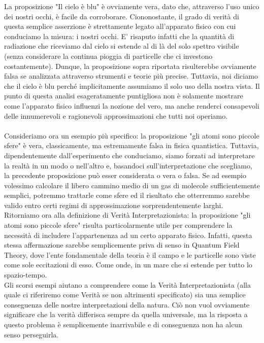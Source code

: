 \documentclass[]{article}
\begin{document}
	La proposizione "Il cielo è blu" è ovviamente vera, dato che, attraverso l'uso unico dei nostri occhi, è facile da corroborare. Ciononostante, il grado di verità di questa semplice asserzione è strettamente legato all'apparato fisico con cui conduciamo la misura: i nostri occhi. E' risaputo infatti che la quantità di radiazione che riceviamo dal cielo si estende al di là del solo spettro visibile (senza considerare la continua pioggia di particelle che ci investono costantemente). Dunque, la proposizione sopra riportata risulterebbe ovviamente falsa se analizzata attraverso strumenti e teorie più precise. Tuttavia, noi diciamo che il cielo è blu perché implicitamente assumiamo il solo uso della nostra vista. Il punto di questa analisi esageratamente puntigliosa non è solamente mostrare come l'apparato fisico influenzi la nozione del vero, ma anche renderci consapevoli delle innumerevoli e ragionevoli approssimazioni che tutti noi operiamo.\\
	\\
	Consideriamo ora un esempio più specifico: la proposizione "gli atomi sono piccole sfere" è vera, classicamente, ma estremamente falsa in fisica quantistica. Tuttavia, dipendentemente dall'esperimento che conduciamo, siamo forzati ad interpretare la realtà in un modo o nell'altro e, basandoci sull'interpretazione che scegliamo, la precedente proposizione può esser considerata o vera o falsa. Se ad esempio volessimo calcolare il libero cammino medio di un gas di molecole sufficientemente semplici, potremmo trattarle come sfere ed il risultato che otterremmo sarebbe valido entro certi regimi di approssimazione sorprendentemente larghi.\\
	Ritorniamo ora alla definizione di Verità Interpretazionista: la proposizione "gli atomi sono piccole sfere" risulta particolarmente utile per comprendere la necessità di includere l'appartenenza ad un certo apparato fisico. Infatti, questa stessa affermazione sarebbe semplicemente priva di senso in Quantum Field Theory, dove l'ente fondamentale della teoria è il campo e le particelle sono viste come sole eccitazioni di esso. Come onde, in un mare che si estende per tutto lo spazio-tempo.\\
	Gli scorsi esempi aiutano a comprendere come la Verità Interpretazionista (alla quale ci riferiremo come Verità se non altrimenti specificato) sia una semplice conseguenza delle nostre interpretazioni della natura. Ciò non vuol ovviamente significare che la verità differisca sempre da quella universale, ma la risposta a questo problema è semplicemente inarrivabile e di conseguenza non ha alcun senso perseguirla.\\
\end{document}
